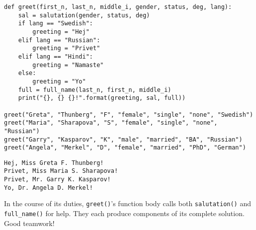 
\begin{Verbatim}[fontsize=\small,samepage=true,frame=single,framesep=3mm]
def greet(first_n, last_n, middle_i, gender, status, deg, lang):
    sal = salutation(gender, status, deg)
    if lang == "Swedish":
        greeting = "Hej"
    elif lang == "Russian":
        greeting = "Privet"
    elif lang == "Hindi":
        greeting = "Namaste"
    else:
        greeting = "Yo"
    full = full_name(last_n, first_n, middle_i)
    print("{}, {} {}!".format(greeting, sal, full))

greet("Greta", "Thunberg", "F", "female", "single", "none", "Swedish")
greet("Maria", "Sharapova", "S", "female", "single", "none", "Russian")
greet("Garry", "Kasparov", "K", "male", "married", "BA", "Russian")
greet("Angela", "Merkel", "D", "female", "married", "PhD", "German")
\end{Verbatim}
\vspace{-.2in}

\begin{Verbatim}[fontsize=\small,samepage=true,frame=leftline,framesep=5mm,framerule=1mm]
Hej, Miss Greta F. Thunberg!
Privet, Miss Maria S. Sharapova!
Privet, Mr. Garry K. Kasparov!
Yo, Dr. Angela D. Merkel!
\end{Verbatim}

In the course of its duties, \texttt{greet()}'s function body calls both
\texttt{salutation()} and \texttt{full\_name()} for help. They each produce
components of its complete solution. Good teamwork!


